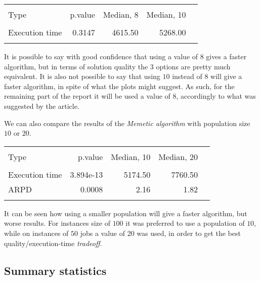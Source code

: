 \documentclass[
12pt,
a4paper,
oneside,
headinclude,
footinclude]{article}
\theoremstyle{definition} %
\begin{document}
\begin{table}[H]
    \centering
    \begin{tabular}{lrrrr}
        \hline
        \\[-1.5ex]
        Type & p.value & Median, 8 & Median, 10 \\ 
        [0.5ex]
        \hline
        \\[-1.5ex]
        Execution time & 0.3147 & 4615.50 & 5268.00 \\ 
        \\[-1.6ex]
        \hline
    \end{tabular}
\end{table}


It is possible to say with good confidence that using a value of $8$ gives a faster algorithm, but in terms of solution quality the 3 options are pretty much equivalent. It is also not possible to say that using $10$ instead of $8$ will give a faster algorithm, in spite of what the plots might suggest. 
As such, for the remaining part of the report it will be used a value of $8$, accordingly to what was suggested by the article.

We can also compare the results of the \textit{Memetic algorithm} with population size $10$ or $20$.

\begin{table}[H]
    \centering
    \begin{tabular}{lrrrr}
        \hline
        \\[-1.5ex]
        Type & p.value & Median, 10 & Median, 20 \\ 
        [0.5ex]
        \hline
        \\[-1.5ex]
        Execution time & 3.894e-13 & 5174.50 & 7760.50 \\ 
        ARPD & 0.0008 & 2.16 & 1.82 \\ 
        \\[-1.6ex]
        \hline
    \end{tabular}
\end{table}

It can be seen how using a smaller population will give a faster algorithm, but worse results. For instances size of $100$ it was preferred to use a population of $10$, while on instances of $50$ jobs a value of $20$ was used, in order to get the best quality/execution-time \textit{tradeoff}.

\subsection{Summary statistics}
\end{document}
